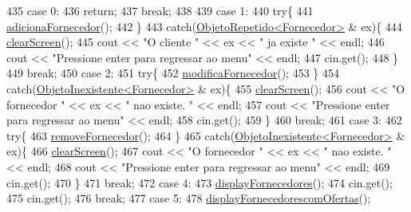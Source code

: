 \begin{DoxyCode}
435     \textcolor{keywordflow}{case} 0:
436         \textcolor{keywordflow}{return};
437         \textcolor{keywordflow}{break};
438 
439     \textcolor{keywordflow}{case} 1:
440         \textcolor{keywordflow}{try}\{
441         \hyperlink{classEmpresa_af20261a3f95a5dd0c4a5a796d9a3d442}{adicionaFornecedor}();
442         \}
443         \textcolor{keywordflow}{catch}(\hyperlink{classObjetoRepetido}{ObjetoRepetido<Fornecedor>} & ex)\{
444             \hyperlink{menu_8h_aceb70c1ed7e11f0863a868704f02214b}{clearScreen}();
445             cout << \textcolor{stringliteral}{"O cliente "} << ex << \textcolor{stringliteral}{" ja existe "} << endl;
446             cout << \textcolor{stringliteral}{"Pressione enter para regressar ao menu"} << endl;
447             cin.get();
448         \}
449         \textcolor{keywordflow}{break};
450     \textcolor{keywordflow}{case} 2:
451         \textcolor{keywordflow}{try}\{
452         \hyperlink{classEmpresa_aa0470e1fd4f41615a230fc8048b8b321}{modificaFornecedor}();
453         \}
454         \textcolor{keywordflow}{catch}(\hyperlink{classObjetoInexistente}{ObjetoInexistente<Fornecedor>} & ex)\{
455             \hyperlink{menu_8h_aceb70c1ed7e11f0863a868704f02214b}{clearScreen}();
456             cout << \textcolor{stringliteral}{"O fornecedor "} << ex << \textcolor{stringliteral}{" nao existe. "} << endl;
457             cout << \textcolor{stringliteral}{"Pressione enter para regressar ao menu"} << endl;
458             cin.get();
459         \}
460         \textcolor{keywordflow}{break};
461     \textcolor{keywordflow}{case} 3:
462         \textcolor{keywordflow}{try}\{
463         \hyperlink{classEmpresa_a9aa7b7e699971eb2e28f0db99c6500c4}{removeFornecedor}();
464         \}
465         \textcolor{keywordflow}{catch}(\hyperlink{classObjetoInexistente}{ObjetoInexistente<Fornecedor>} & ex)\{
466             \hyperlink{menu_8h_aceb70c1ed7e11f0863a868704f02214b}{clearScreen}();
467             cout << \textcolor{stringliteral}{"O fornecedor "} << ex << \textcolor{stringliteral}{" nao existe. "} << endl;
468             cout << \textcolor{stringliteral}{"Pressione enter para regressar ao menu"} << endl;
469             cin.get();
470         \}
471         \textcolor{keywordflow}{break};
472     \textcolor{keywordflow}{case} 4:
473         \hyperlink{classEmpresa_a55c3756c01b45b41ad03f4e4f3e4dcac}{displayFornecedores}();
474         cin.get();
475         cin.get();
476         \textcolor{keywordflow}{break};
477     \textcolor{keywordflow}{case} 5:
478         \hyperlink{classEmpresa_aa47e9a64800a41180b7f374b73a1f32b}{displayFornecedorescomOfertas}();

\end{DoxyCode}

